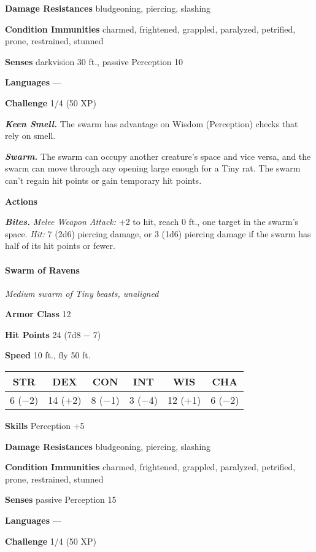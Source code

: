 \documentclass[
]{article}
\begin{document}
\textbf{Damage Resistances} bludgeoning, piercing, slashing

\textbf{Condition Immunities} charmed, frightened, grappled, paralyzed,
petrified, prone, restrained, stunned

\textbf{Senses} darkvision 30 ft., passive Perception 10

\textbf{Languages} ---

\textbf{Challenge} 1/4 (50 XP)

\emph{\textbf{Keen Smell.}} The swarm has advantage on Wisdom
(Perception) checks that rely on smell.

\emph{\textbf{Swarm.}} The swarm can occupy another creature's space and
vice versa, and the swarm can move through any opening large enough for
a Tiny rat. The swarm can't regain hit points or gain temporary hit
points.

\textbf{Actions}

\emph{\textbf{Bites.}} \emph{Melee Weapon Attack:} +2 to hit, reach 0
ft., one target in the swarm's space. \emph{Hit:} 7 (2d6) piercing
damage, or 3 (1d6) piercing damage if the swarm has half of its hit
points or fewer.

\hypertarget{swarm-of-ravens}{%
\paragraph{Swarm of Ravens}\label{swarm-of-ravens}}

\emph{Medium swarm of Tiny beasts, unaligned}

\textbf{Armor Class} 12

\textbf{Hit Points} 24 (7d8 − 7)

\textbf{Speed} 10 ft., fly 50 ft.

\begin{longtable}[]{@{}cccccc@{}}
\toprule
STR & DEX & CON & INT & WIS & CHA\tabularnewline
\midrule
\endhead
6 (−2) & 14 (+2) & 8 (−1) & 3 (−4) & 12 (+1) & 6 (−2)\tabularnewline
\bottomrule
\end{longtable}

\textbf{Skills} Perception +5

\textbf{Damage Resistances} bludgeoning, piercing, slashing

\textbf{Condition Immunities} charmed, frightened, grappled, paralyzed,
petrified, prone, restrained, stunned

\textbf{Senses} passive Perception 15

\textbf{Languages} ---

\textbf{Challenge} 1/4 (50 XP)
\end{document}
